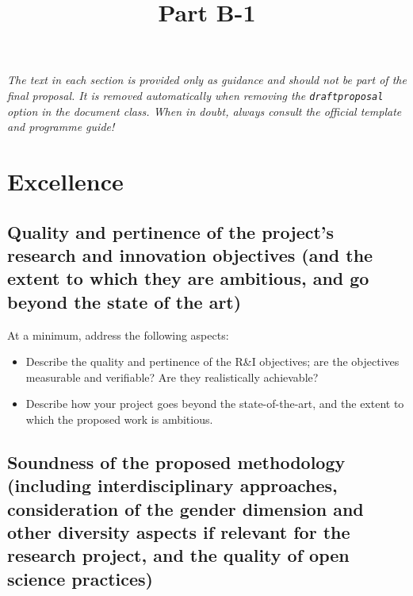 \documentclass[12pt,draftproposal]{msca-pf}
\title{Part B-1}
\author{}
\date{}
\begin{document}
\maketitle

\begin{mscaexplanation}
\itshape The text in each section is provided only as guidance and should not be part of
the final proposal. It is removed automatically when removing the \texttt{draftproposal}
option in the document class. When in doubt, always consult the official template and
programme guide!
\end{mscaexplanation}

\section{Excellence}
\label{sc:excellence}

\subsection{Quality and pertinence of the project's research and innovation objectives
    (and the extent to which they are ambitious, and go beyond the state of the art)}
\label{ssc:excellence:quality}

\begin{mscaexplanation}
At a minimum, address the following aspects:

\begin{itemize}
    \item Describe the quality and pertinence of the R\&I objectives; are the
    objectives measurable and verifiable? Are they realistically achievable?

    \item Describe how your project goes beyond the state-of-the-art, and the
    extent to which the proposed work is ambitious.
\end{itemize}
\end{mscaexplanation}

\subsection{Soundness of the proposed methodology
    (including interdisciplinary approaches, consideration of the gender
    dimension and other diversity aspects if relevant for the research project,
    and the quality of open science practices)}
\label{ssc:excellence:methodology}
\end{document}
